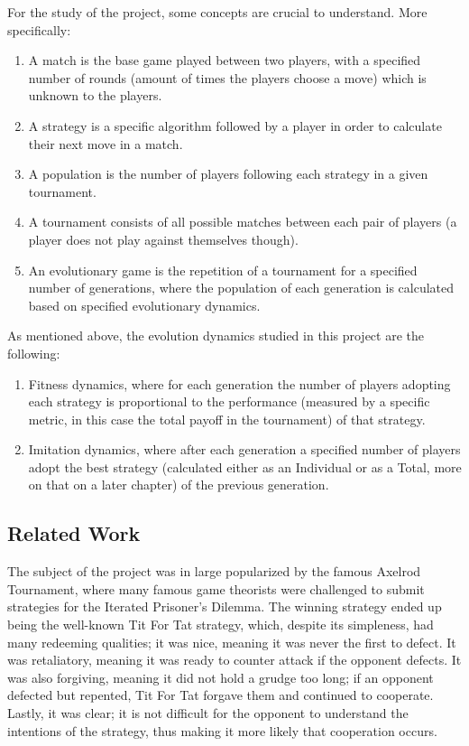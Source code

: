 For the study of the project, some concepts are crucial to understand. More specifically:
\begin{enumerate}
  \item A match is the base game played between two players, with a specified number of rounds (amount of times the players choose a move) which is unknown to the players.
  \item A strategy is a specific algorithm followed by a player in order to calculate their next move in a match.
  \item A population is the number of players following each strategy in a given tournament.
  \item A tournament consists of all possible matches between each pair of players (a player does not play against themselves though).
  \item An evolutionary game is the repetition of a tournament for a specified number of generations, where the population of each generation is calculated based on specified evolutionary dynamics.
\end{enumerate}

As mentioned above, the evolution dynamics studied in this project are the following:
\begin{enumerate}
  \item Fitness dynamics, where for each generation the number of players adopting each strategy is proportional to the performance (measured by a specific metric, in this case the total payoff in the tournament) of that strategy.
  \item Imitation dynamics, where after each generation a specified number of players adopt the best strategy (calculated either as an Individual or as a Total, more on that on a later chapter) of the previous generation.
\end{enumerate}

\subsection{Related Work}
The subject of the project was in large popularized by the famous Axelrod Tournament\cite{axelrod1981}\cite{axelrod1988}, where many famous game theorists were challenged to submit strategies for the Iterated Prisoner's Dilemma. The winning strategy ended up being the well-known Tit For Tat strategy, which, despite its simpleness, had many redeeming qualities; it was nice, meaning it was never the first to defect. It was retaliatory, meaning it was ready to counter attack if the opponent defects. It was also forgiving, meaning it did not hold a grudge too long; if an opponent defected but repented, Tit For Tat forgave them and continued to cooperate. Lastly, it was clear; it is not difficult for the opponent to understand the intentions of the strategy, thus making it more likely that cooperation occurs.

